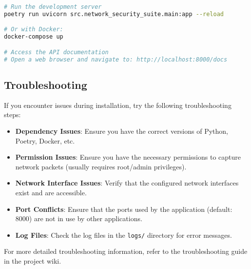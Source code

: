 \begin{lstlisting}[language=bash, caption=Installation Verification]
# Run the development server
poetry run uvicorn src.network_security_suite.main:app --reload

# Or with Docker:
docker-compose up

# Access the API documentation
# Open a web browser and navigate to: http://localhost:8000/docs
\end{lstlisting}

\subsection{Troubleshooting}
If you encounter issues during installation, try the following troubleshooting steps:

\begin{itemize}
    \item \textbf{Dependency Issues}: Ensure you have the correct versions of Python, Poetry, Docker, etc.
    \item \textbf{Permission Issues}: Ensure you have the necessary permissions to capture network packets (usually requires root/admin privileges).
    \item \textbf{Network Interface Issues}: Verify that the configured network interfaces exist and are accessible.
    \item \textbf{Port Conflicts}: Ensure that the ports used by the application (default: 8000) are not in use by other applications.
    \item \textbf{Log Files}: Check the log files in the \texttt{logs/} directory for error messages.
\end{itemize}

For more detailed troubleshooting information, refer to the troubleshooting guide in the project wiki.